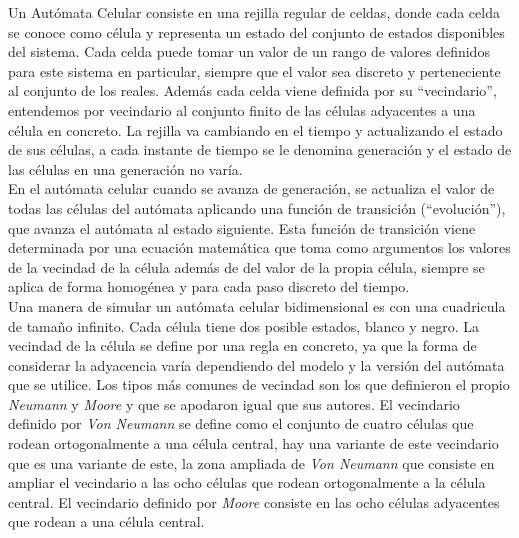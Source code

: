 Un Autómata Celular consiste en una rejilla regular de celdas, donde cada celda se conoce como célula y representa un estado del conjunto de estados disponibles del sistema. Cada celda puede tomar un valor de un rango de valores definidos para este sistema en particular, siempre que el valor sea discreto y perteneciente al conjunto de los reales. Además cada celda viene definida por su ``vecindario'', entendemos por vecindario al conjunto finito de las células adyacentes a una célula en concreto.  La rejilla va cambiando en el tiempo y actualizando el estado de sus células, a cada instante de tiempo se le denomina generación y el estado de las células en una generación no varía.  \\


En el autómata celular cuando se avanza de generación, se actualiza el valor de todas las células del autómata aplicando una función de transición (``evolución''), que avanza el autómata al estado siguiente. Esta función de transición viene determinada por una ecuación matemática que toma como argumentos los valores de la vecindad de la célula además de del valor de la propia célula, siempre se aplica de forma homogénea y para cada paso discreto del tiempo.\\

Una manera de simular un autómata celular bidimensional es con una cuadricula de tamaño infinito. Cada célula tiene dos posible estados, blanco y negro. La vecindad de la célula se define por una regla en concreto, ya que la forma de considerar la adyacencia varía dependiendo del modelo y la versión del autómata que se utilice. Los tipos más comunes de vecindad son los que definieron el propio \textit{Neumann} y \textit{Moore} y que se apodaron igual que sus autores. El vecindario definido por \textit{Von Neumann} se define como el conjunto de cuatro células que rodean ortogonalmente a una célula central, hay una variante de este vecindario que es una variante de este, la zona ampliada de \textit{Von Neumann} que consiste en ampliar el vecindario a las ocho células que rodean ortogonalmente a la célula central. El vecindario definido por \textit{Moore} consiste en las ocho células adyacentes que rodean a una célula central.\\


